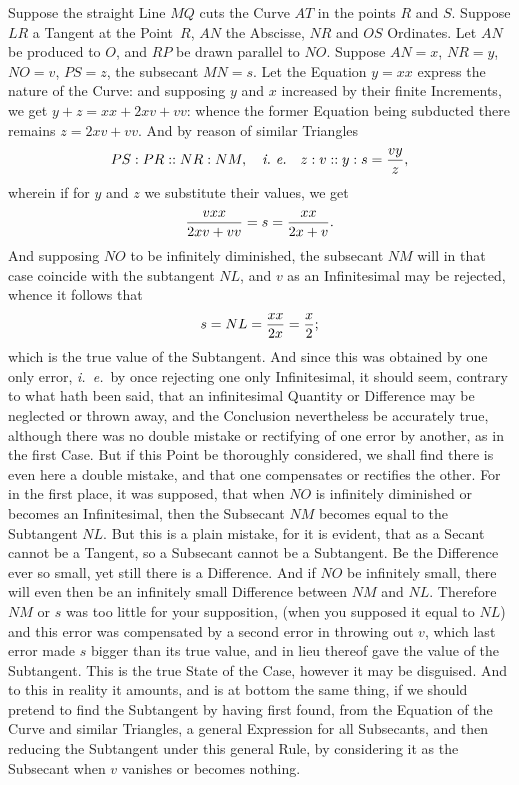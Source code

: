 \noindent
Suppose the straight Line $MQ$ cuts the Curve $AT$ in the points
$R$ and $S$.  Suppose $LR$ a Tangent at the Point~$R$, $AN$ the
Abscisse, $NR$ and $OS$ Ordinates.  Let $AN$ be produced to $O$,
and $RP$ be drawn parallel to $NO$.  Suppose $AN = x$, $NR = y$,
$NO = v$, $PS = z$, the subsecant $MN = s$.  Let the Equation
$y = xx$ express the nature of the Curve: and supposing $y$ and
$x$ increased by their finite Increments, we get
$y + z = xx + 2xv + vv$: whence the former Equation being
subducted there remains $z = 2xv + vv$.  And by reason of similar
Triangles
$$PS : PR :: NR : NM, \quad\hbox{\it i.~e.}\quad z:v::y:s
   = {vy \over z},$$
wherein if for $y$ and $z$ we substitute their values, we get
$${vxx \over 2xv + vv} = s = {xx \over 2x + v}.$$
And supposing $NO$ to be infinitely diminished, the subsecant
$NM$ will in that case coincide with the subtangent $NL$, and $v$
as an Infinitesimal may be rejected, whence it follows that
$$s = NL = {xx \over 2x} = {x \over 2};$$
which is the true value of the Subtangent.  And since this was
obtained by one only error, {\it i.~e.}\ by once rejecting one
only Infinitesimal, it should seem, contrary to what hath been
said, that an infinitesimal Quantity or Difference may be
neglected or thrown away, and the Conclusion nevertheless be
accurately true, although there was no double mistake or
rectifying of one error by another, as in the first Case.  But
if this Point be thoroughly considered, we shall find there is
even here a double mistake, and that one compensates or rectifies
the other.  For in the first place, it was supposed, that when
$NO$ is infinitely diminished or becomes an Infinitesimal, then
the Subsecant $NM$ becomes equal to the Subtangent $NL$.  But
this is a plain mistake, for it is evident, that as a Secant
cannot be a Tangent, so a Subsecant cannot be a Subtangent.  Be
the Difference ever so small, yet still there is a Difference.
And if $NO$ be infinitely small, there will even then be an
infinitely small Difference between $NM$ and $NL$.  Therefore
$NM$ or $s$ was too little for your supposition, (when you
supposed it equal to $NL$) and this error was compensated by a
second error in throwing out $v$, which last error made $s$
bigger than its true value, and in lieu thereof gave the value of
the Subtangent.  This is the true State of the Case, however it
may be disguised.  And to this in reality it amounts, and is at
bottom the same thing, if we should pretend to find the
Subtangent by having first found, from the Equation of the Curve
and similar Triangles, a general Expression for all Subsecants,
and then reducing the Subtangent under this general Rule, by
considering it as the Subsecant when $v$ vanishes or becomes
nothing.

